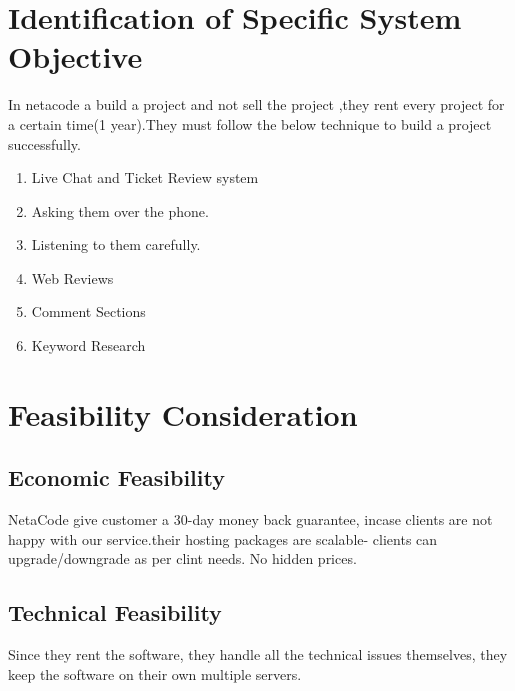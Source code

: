 \documentclass[a4paper,12pt]{report}
\begin{document}
\section{Identification of Specific System Objective}
In netacode a build a project and not sell the project ,they rent every project for a certain time(1 year).They must follow the below technique to build a project successfully.
\begin{enumerate}
	\item Live Chat and Ticket Review system
	\item Asking them over the phone.
	\item Listening to them carefully.
	\item Web Reviews
	\item Comment Sections
	\item Keyword Research
\end{enumerate}
\section{Feasibility Consideration}
\subsection{Economic Feasibility}
NetaCode give customer a 30-day money back guarantee, incase clients are not happy with our service.their hosting packages are scalable- clients can upgrade/downgrade as per clint needs.
No hidden prices.
\subsection{Technical Feasibility}
Since they rent the software, they handle all the technical issues themselves, they keep the software on their own multiple servers.
\end{document}
